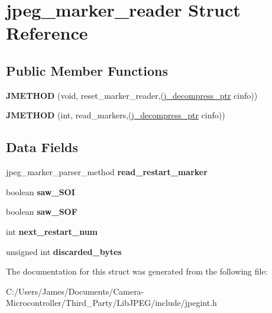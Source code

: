 \hypertarget{structjpeg__marker__reader}{}\section{jpeg\+\_\+marker\+\_\+reader Struct Reference}
\label{structjpeg__marker__reader}
\subsection*{Public Member Functions}
\begin{DoxyCompactItemize}
\item 
\mbox{\label{structjpeg__marker__reader_a3f23c456763327032a9132821a046cd9}} 
{\bfseries J\+M\+E\+T\+H\+OD} (void, reset\+\_\+marker\+\_\+reader,(\hyperlink{structjpeg__decompress__struct}{j\+\_\+decompress\+\_\+ptr} cinfo))
\item 
\mbox{\label{structjpeg__marker__reader_a1d126254af1b3130c7be1201bfbc0ecf}} 
{\bfseries J\+M\+E\+T\+H\+OD} (int, read\+\_\+markers,(\hyperlink{structjpeg__decompress__struct}{j\+\_\+decompress\+\_\+ptr} cinfo))
\end{DoxyCompactItemize}
\subsection*{Data Fields}
\begin{DoxyCompactItemize}
\item 
\mbox{\label{structjpeg__marker__reader_a167acee06e19addb42fb076bd2ba5f68}} 
jpeg\+\_\+marker\+\_\+parser\+\_\+method {\bfseries read\+\_\+restart\+\_\+marker}
\item 
\mbox{\label{structjpeg__marker__reader_a054d4b3cf33a401e662bc8cd0da73630}} 
boolean {\bfseries saw\+\_\+\+S\+OI}
\item 
\mbox{\label{structjpeg__marker__reader_a995b43d54b1b97ba39b62751a7a153e4}} 
boolean {\bfseries saw\+\_\+\+S\+OF}
\item 
\mbox{\label{structjpeg__marker__reader_a3ff97c7e358a731ef927ec117437d21b}} 
int {\bfseries next\+\_\+restart\+\_\+num}
\item 
\mbox{\label{structjpeg__marker__reader_a3502970396e1d3cf53eb85c65517a0bc}} 
unsigned int {\bfseries discarded\+\_\+bytes}
\end{DoxyCompactItemize}


The documentation for this struct was generated from the following file\+:\begin{DoxyCompactItemize}
\item 
C\+:/\+Users/\+James/\+Documents/\+Camera-\/\+Microcontroller/\+Third\+\_\+\+Party/\+Lib\+J\+P\+E\+G/include/jpegint.\+h\end{DoxyCompactItemize}
